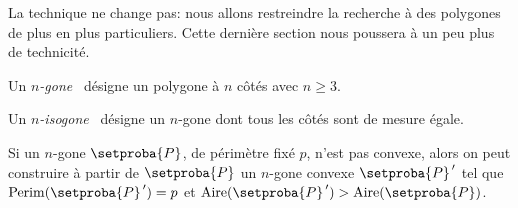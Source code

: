 La technique ne change pas: nous allons restreindre la recherche à des polygones de plus en plus particuliers. Cette dernière section nous poussera à un peu plus de technicité.




\begin{defi}
	Un \og \emph{$n$-gone} \fg\ désigne un polygone à $n$ côtés avec $n \geq 3$.
\end{defi}


\begin{defi}
	Un \og \emph{$n$-isogone} \fg\ désigne un $n$-gone dont tous les côtés sont de mesure égale.
\end{defi}




\begin{fact}\label{conv-poly}
	Si un $n$-gone $\setproba{P}$, de périmètre fixé $p$, n'est pas convexe, alors on peut construire à partir de $\setproba{P}$ un $n$-gone convexe $\setproba{P}^{\,\prime}$ tel que $\perim{\setproba{P}^{\,\prime}} = p$ et $\area{\setproba{P}^{\,\prime}} > \area{\setproba{P}}$.
\end{fact}



